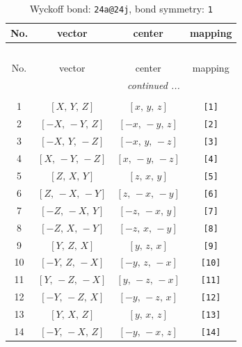 \documentclass[fleqn,8pt]{jsarticle}
\begin{document}
\begin{longtable}{cccc}
\caption{Wyckoff bond: {\tt 24a@24j}, bond symmetry: {\tt 1}}
 \\
 \hline \hline
No. & vector & center & mapping \\ \hline \endfirsthead

\multicolumn{3}{l}{\tablename\ \thetable{}} \\
 \hline \hline
No. & vector & center & mapping \\ \hline \endhead

 \hline \hline
\multicolumn{3}{r}{\footnotesize\it continued ...} \\ \endfoot

 \hline \hline
\multicolumn{3}{r}{} \\ \endlastfoot

1 & $\left[ X,\, Y,\, Z \right]$ & $\left[ x,\, y,\, z \right]$ & {\tt [1]} \\ \hline
2 & $\left[ - X,\, - Y,\, Z \right]$ & $\left[ - x,\, - y,\, z \right]$ & {\tt [2]} \\ \hline
3 & $\left[ - X,\, Y,\, - Z \right]$ & $\left[ - x,\, y,\, - z \right]$ & {\tt [3]} \\ \hline
4 & $\left[ X,\, - Y,\, - Z \right]$ & $\left[ x,\, - y,\, - z \right]$ & {\tt [4]} \\ \hline
5 & $\left[ Z,\, X,\, Y \right]$ & $\left[ z,\, x,\, y \right]$ & {\tt [5]} \\ \hline
6 & $\left[ Z,\, - X,\, - Y \right]$ & $\left[ z,\, - x,\, - y \right]$ & {\tt [6]} \\ \hline
7 & $\left[ - Z,\, - X,\, Y \right]$ & $\left[ - z,\, - x,\, y \right]$ & {\tt [7]} \\ \hline
8 & $\left[ - Z,\, X,\, - Y \right]$ & $\left[ - z,\, x,\, - y \right]$ & {\tt [8]} \\ \hline
9 & $\left[ Y,\, Z,\, X \right]$ & $\left[ y,\, z,\, x \right]$ & {\tt [9]} \\ \hline
10 & $\left[ - Y,\, Z,\, - X \right]$ & $\left[ - y,\, z,\, - x \right]$ & {\tt [10]} \\ \hline
11 & $\left[ Y,\, - Z,\, - X \right]$ & $\left[ y,\, - z,\, - x \right]$ & {\tt [11]} \\ \hline
12 & $\left[ - Y,\, - Z,\, X \right]$ & $\left[ - y,\, - z,\, x \right]$ & {\tt [12]} \\ \hline
13 & $\left[ Y,\, X,\, Z \right]$ & $\left[ y,\, x,\, z \right]$ & {\tt [13]} \\ \hline
14 & $\left[ - Y,\, - X,\, Z \right]$ & $\left[ - y,\, - x,\, z \right]$ & {\tt [14]} \\ \hline

\end{longtable}
\end{document}
